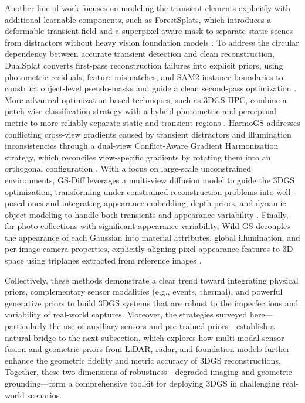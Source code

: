 \documentclass[11pt]{article}
\begin{document}
Another line of work focuses on modeling the transient elements explicitly with additional learnable components, such as ForestSplats, which introduces a deformable transient field and a superpixel-aware mask to separate static scenes from distractors without heavy vision foundation models \cite{ref301}. To address the circular dependency between accurate transient detection and clean reconstruction, DualSplat converts first-pass reconstruction failures into explicit priors, using photometric residuals, feature mismatches, and SAM2 instance boundaries to construct object-level pseudo-masks and guide a clean second-pass optimization \cite{ref302}. More advanced optimization-based techniques, such as 3DGS-HPC, combine a patch-wise classification strategy with a hybrid photometric and perceptual metric to more reliably separate static and transient regions \cite{ref303}. HarmoGS addresses conflicting cross-view gradients caused by transient distractors and illumination inconsistencies through a dual-view Conflict-Aware Gradient Harmonization strategy, which reconciles view-specific gradients by rotating them into an orthogonal configuration \cite{ref182}. With a focus on large-scale unconstrained environments, GS-Diff leverages a multi-view diffusion model to guide the 3DGS optimization, transforming under-constrained reconstruction problems into well-posed ones and integrating appearance embedding, depth priors, and dynamic object modeling to handle both transients and appearance variability \cite{ref304}. Finally, for photo collections with significant appearance variability, Wild-GS decouples the appearance of each Gaussian into material attributes, global illumination, and per-image camera properties, explicitly aligning pixel appearance features to 3D space using triplanes extracted from reference images \cite{ref305}.

Collectively, these methods demonstrate a clear trend toward integrating physical priors, complementary sensor modalities (e.g., events, thermal), and powerful generative priors to build 3DGS systems that are robust to the imperfections and variability of real-world captures. Moreover, the strategies surveyed here---particularly the use of auxiliary sensors and pre-trained priors---establish a natural bridge to the next subsection, which explores how multi-modal sensor fusion and geometric priors from LiDAR, radar, and foundation models further enhance the geometric fidelity and metric accuracy of 3DGS reconstructions. Together, these two dimensions of robustness---degraded imaging and geometric grounding---form a comprehensive toolkit for deploying 3DGS in challenging real-world scenarios.
\end{document}
